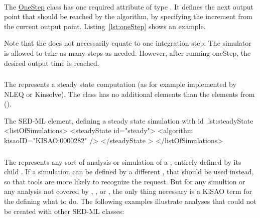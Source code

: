 \paragraph*{}
\label{sec:step}
The \hyperref[class:oneStep]{OneStep} class has one required attribute  of type . It defines the next output point that should be reached by the algorithm, by specifying the increment from the current output point. Listing~\ref{lst:oneStep} shows an example. 

Note that the  does not necessarily equate to one integration step. The simulator is allowed to take as many steps as needed. However, after running oneStep, the desired output time is reached.


\subsubsection{}
\label{class:steadyState}
The  represents a steady state computation (as for example implemented by NLEQ or Kinsolve). The  class has no additional elements than the elements from \Simulation ().


\begin{myXmlLst}{The SED-ML  element, defining a steady state simulation with id .}{lst:steadyState}
<listOfSimulations>
	<steadyState id="steady"> 
		<algorithm kisaoID="KISAO:0000282" />
	</steadyState > 
</listOfSimulations>
\end{myXmlLst}


\subsubsection{}
\label{class:analysis}
The  represents any sort of analysis or simulation of a \Model, entirely defined by its child \Algorithm.  If a simulation can be defined by a different \Simulation, that should be used instead, so that tools are more likely to recognize the request.  But for any simultion or any analysis not covered by \SteadyState, \OneStep, or \UniformTimeCourse, the only thing necessary is a KiSAO term for the \Algorithm defining what to do.  The following examples illustrate analyses that could not be created with other SED-ML \Simulation classes:

